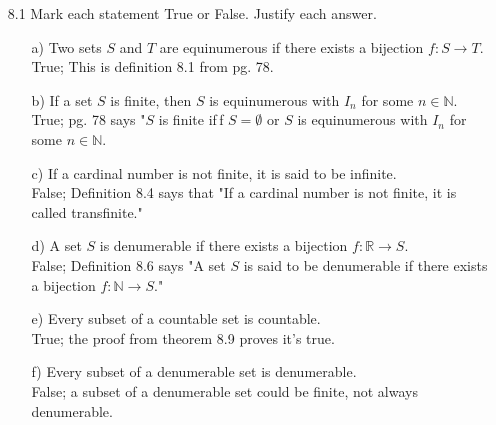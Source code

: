 \documentclass[12pt]{article}
\begin{document}
\begin{enumerate}
\item[8.1] Mark each statement True or False. Justify each answer.
\begin{enumerate}
\item[a)] Two sets $S$ and $T$ are equinumerous if there exists a bijection $f: S \rightarrow T$. \\
True; This is definition 8.1 from pg. 78.
\item[b)] If a set $S$ is finite, then $S$ is equinumerous with $I_n$ for some $n \in \mathbb{N}$. \\
True; pg. 78 says "$S$ is finite if\,f $S = \emptyset$ or $S$ is equinumerous with $I_n$ for some
$n \in \mathbb{N}$.
\item[c)] If a cardinal number is not finite, it is said to be infinite.\\
False; Definition 8.4 says that "If a cardinal number is not finite, it is called transfinite."
\item[d)] A set $S$ is denumerable if there exists a bijection $f: \mathbb{R} \rightarrow S$.\\
False; Definition 8.6 says "A set $S$ is said to be denumerable if there exists a bijection
$f: \mathbb{N} \rightarrow S$."
\item[e)] Every subset of a countable set is countable.\\
True; the proof from theorem 8.9 proves it's true.
\item[f)] Every subset of a denumerable set is denumerable.\\
False; a subset of a denumerable set could be finite, not always denumerable.
\end{enumerate}


\end{enumerate}
\end{document}
